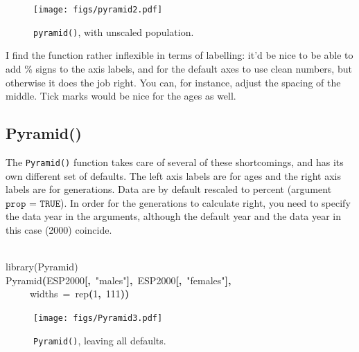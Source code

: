 \documentclass[a4paper]{article}
\newcommand{\hlnumber}[1]{\textcolor[rgb]{0.0823529411764706,0.0784313725490196,0.709803921568627}{#1}}%
\newcommand{\hlfunctioncall}[1]{\textcolor[rgb]{1,0,0}{#1}}%
\newcommand{\hlstring}[1]{\textcolor[rgb]{0.6,0.6,1}{#1}}%
\newcommand{\hlkeyword}[1]{\textcolor[rgb]{0,0,0}{\textbf{#1}}}%
\newcommand{\hlargument}[1]{\textcolor[rgb]{0.694117647058824,0.247058823529412,0.0196078431372549}{#1}}%
\newcommand{\hlcomment}[1]{\textcolor[rgb]{0.8,0.8,0.8}{#1}}%
\newcommand{\hlsymbol}[1]{\textcolor[rgb]{0,0,0}{#1}}%
\newcommand{\hlprompt}[1]{\textcolor[rgb]{0,0,0}{#1}}%
\newcommand{\hlstd}[1]{\textcolor[rgb]{0,0,0}{#1}}%
\newenvironment{Houtput}{\raggedright}{%
%
}
\begin{document}
\begin{figure}[H]
\centering
\texttt{[image: figs/pyramid2.pdf]}
\caption{\texttt{pyramid()}, with unscaled population.}
\end{figure}

I find the function rather inflexible in terms of labelling: it'd be nice to be able to add \% signs to the axis labels, and for the default axes to use clean numbers, but otherwise it does the job right. You can, for instance, adjust the spacing of the middle. Tick marks would be nice for the ages as well.

\subsection{Pyramid()}
The \texttt{Pyramid()} function takes care of several of these shortcomings, and has its own different set of defaults. The left axis labels are for ages and the right axis labels are for generations. Data are by default rescaled to percent (argument $\texttt{prop = TRUE}$). In order for the generations to calculate right, you need to specify the data year in the arguments, although the default year and the data year in this case (2000) coincide. 



\begin{Houtput}
\hspace*{\fill}\\
\hlstd{}\ttfamily\noindent
\hlprompt{\usebox{\hlnormalsizeboxgreaterthan}{\ }}\hlcomment{\usebox{\hlnormalsizeboxhash}{\ }library(Pyramid)}\mbox{}
\normalfont
\hspace*{\fill}\\
\hlstd{}\ttfamily\noindent
\hlprompt{\usebox{\hlnormalsizeboxgreaterthan}{\ }}\hlfunctioncall{Pyramid}\hlkeyword{(}\hlsymbol{ESP2000}\hlkeyword{[}\hlkeyword{,}{\ }\hlstring{"males"}\hlkeyword{]}\hlkeyword{,}{\ }\hlsymbol{ESP2000}\hlkeyword{[}\hlkeyword{,}{\ }\hlstring{"females"}\hlkeyword{]}\hlkeyword{,}\hspace*{\fill}\\
\hlstd{}\hlprompt{{\ }}{\ }{\ }{\ }{\ }\hlargument{widths}{\ }\hlargument{=}{\ }\hlfunctioncall{rep}\hlkeyword{(}\hlnumber{1}\hlkeyword{,}{\ }\hlnumber{111}\hlkeyword{)}\hlkeyword{)}\mbox{}
\normalfont
\hspace*{\fill}\\
\hlstd{}
\end{Houtput}



\begin{figure}[H]
\centering
\texttt{[image: figs/Pyramid3.pdf]}
\caption{\texttt{Pyramid()}, leaving all defaults.}
\end{figure}
\end{document}
